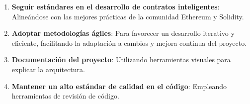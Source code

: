 \begin{enumerate}

\item \textbf{Seguir estándares en el desarrollo de contratos inteligentes}: Alineándose con las mejores prácticas de la comunidad Ethereum y Solidity. 

\item \textbf{Adoptar metodologías ágiles}: Para favorecer un desarrollo iterativo y eficiente, facilitando la adaptación a cambios y mejora continua del proyecto.

\item \textbf{Documentación del proyecto}: Utilizando herramientas visuales para explicar la arquitectura. 

\item \textbf{Mantener un alto estándar de calidad en el código}: Empleando herramientas de revisión de código.



\end{enumerate}